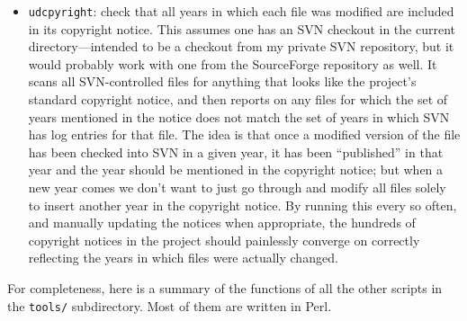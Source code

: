 \documentclass[14pt]{extarticle}
\begin{document}
\begin{itemize}
\item \texttt{udcpyright}: check that all years in which each file was modified
are included in its copyright notice.  This assumes one has an SVN checkout
in the current directory---intended to be a checkout from my private SVN
repository, but it would probably work with one from the SourceForge
repository as well.  It scans all SVN-controlled files for anything that
looks like the project's standard copyright notice, and then reports on any
files for which the set of years mentioned in the notice does not match the
set of years in which SVN has log entries for that file.  The idea is that
once a modified version of the file has been checked into SVN in a given
year, it has been ``published'' in that year and the year should be
mentioned in the copyright notice; but when a new year comes we don't want
to just go through and modify all files solely to insert another year in the
copyright notice.  By running this every so often, and manually updating the
notices when appropriate, the hundreds of copyright notices in the project
should painlessly converge on correctly reflecting the years in which files
were actually changed.

\end{itemize}

For completeness, here is a summary of the functions of all the other
scripts in the \texttt{tools/} subdirectory.  Most of them are written in
Perl.
\end{document}
